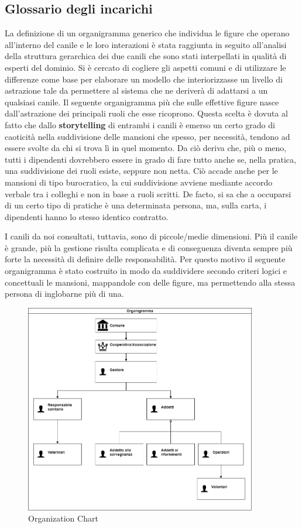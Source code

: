     \subsection{Glossario degli incarichi}

        La definizione di un organigramma generico che individua le figure che operano all'interno del canile e le loro interazioni è stata raggiunta in seguito all'analisi della struttura gerarchica dei due canili che sono stati interpellati in qualità di esperti del dominio. Si è cercato di cogliere gli aspetti comuni e di utilizzare le differenze come base per elaborare un modello che interiorizzasse un livello di astrazione tale da permettere al sistema che ne deriverà di adattarsi a un qualsiasi canile. Il seguente organigramma più che sulle effettive figure nasce dall'astrazione dei principali ruoli che esse ricoprono. Questa scelta è dovuta al fatto che dallo \textbf{storytelling} di entrambi i canili è emerso un certo grado di caoticità nella suddivisione delle mansioni che spesso, per necessità, tendono ad essere svolte da chi si trova lì in quel momento. Da ciò deriva che, più o meno, tutti i dipendenti dovrebbero essere in grado di fare tutto anche se, nella pratica, una suddivisione dei ruoli esiste, seppure non netta. Ciò accade anche per le mansioni di tipo burocratico, la cui suddivisione avviene mediante accordo verbale tra i colleghi e non in base a ruoli scritti. De facto, si sa che a occuparsi di un certo tipo di pratiche è una determinata persona, ma, sulla carta, i dipendenti hanno lo stesso identico contratto.
        
        I canili da noi consultati, tuttavia, sono di piccole/medie dimensioni. Più il canile è grande, più la gestione risulta complicata e di conseguenza diventa sempre più forte la necessità di definire delle responsabilità. Per questo motivo il seguente organigramma è stato costruito in modo da suddividere secondo criteri logici e concettuali le mansioni, mappandole con delle figure, ma permettendo alla stessa persona di inglobarne più di una.
        
        \begin{figure}[ht]
            \caption{Organization Chart}
            \centering
            \includegraphics[width=0.9\textwidth]{DrawIo/organizationChart.png}
        \end{figure}
